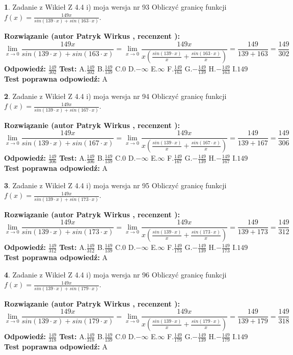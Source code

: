 \documentclass[12pt, a4paper]{article}
\theoremstyle{definition} %
\newtheorem{zad}{}
\newcommand{\zadStart}[1]{\begin{zad}#1\newline}
\newcommand{\zadStop}{\end{zad}}
\newcommand{\rozwStart}[2]{\noindent \textbf{Rozwiązanie (autor #1 , recenzent #2): }\newline}
\newcommand{\rozwStop}{\newline}
\newcommand{\odpStart}{\noindent \textbf{Odpowiedź:}\newline}
\newcommand{\odpStop}{\newline}
\newcommand{\testStart}{\noindent \textbf{Test:}\newline}
\newcommand{\testStop}{\newline}
\newcommand{\kluczStart}{\noindent \textbf{Test poprawna odpowiedź:}\newline}
\newcommand{\kluczStop}{\newline}
\begin{document}
\zadStart{Zadanie z Wikieł Z 4.4 i) moja wersja nr 93}
Obliczyć granicę funkcji $f(x)=\frac{149x}{sin(139\cdot x) +sin(163\cdot x)}$.
\zadStop
\rozwStart{Patryk Wirkus}{}
$$\lim\limits_{x\to 0}\frac{149x}{sin(139\cdot x) +sin(163\cdot x)}=\lim\limits_{x\to 0}\frac{149x}{x(\frac{sin(139\cdot x)}{x}+\frac{sin(163\cdot x)}{x})}=\frac{149}{139+163} = \frac{149}{302}$$
\rozwStop
\odpStart
$\frac{149}{302}$
\odpStop
\testStart
A.$\frac{149}{302}$
B.$\frac{149}{139}$
C.$0$
D.$-\infty$
E.$\infty$
F.$\frac{149}{163}$
G.$-\frac{149}{139}$
H.$-\frac{149}{163}$
I.$149$
\testStop
\kluczStart
A
\kluczStop



\zadStart{Zadanie z Wikieł Z 4.4 i) moja wersja nr 94}
Obliczyć granicę funkcji $f(x)=\frac{149x}{sin(139\cdot x) +sin(167\cdot x)}$.
\zadStop
\rozwStart{Patryk Wirkus}{}
$$\lim\limits_{x\to 0}\frac{149x}{sin(139\cdot x) +sin(167\cdot x)}=\lim\limits_{x\to 0}\frac{149x}{x(\frac{sin(139\cdot x)}{x}+\frac{sin(167\cdot x)}{x})}=\frac{149}{139+167} = \frac{149}{306}$$
\rozwStop
\odpStart
$\frac{149}{306}$
\odpStop
\testStart
A.$\frac{149}{306}$
B.$\frac{149}{139}$
C.$0$
D.$-\infty$
E.$\infty$
F.$\frac{149}{167}$
G.$-\frac{149}{139}$
H.$-\frac{149}{167}$
I.$149$
\testStop
\kluczStart
A
\kluczStop



\zadStart{Zadanie z Wikieł Z 4.4 i) moja wersja nr 95}
Obliczyć granicę funkcji $f(x)=\frac{149x}{sin(139\cdot x) +sin(173\cdot x)}$.
\zadStop
\rozwStart{Patryk Wirkus}{}
$$\lim\limits_{x\to 0}\frac{149x}{sin(139\cdot x) +sin(173\cdot x)}=\lim\limits_{x\to 0}\frac{149x}{x(\frac{sin(139\cdot x)}{x}+\frac{sin(173\cdot x)}{x})}=\frac{149}{139+173} = \frac{149}{312}$$
\rozwStop
\odpStart
$\frac{149}{312}$
\odpStop
\testStart
A.$\frac{149}{312}$
B.$\frac{149}{139}$
C.$0$
D.$-\infty$
E.$\infty$
F.$\frac{149}{173}$
G.$-\frac{149}{139}$
H.$-\frac{149}{173}$
I.$149$
\testStop
\kluczStart
A
\kluczStop



\zadStart{Zadanie z Wikieł Z 4.4 i) moja wersja nr 96}
Obliczyć granicę funkcji $f(x)=\frac{149x}{sin(139\cdot x) +sin(179\cdot x)}$.
\zadStop
\rozwStart{Patryk Wirkus}{}
$$\lim\limits_{x\to 0}\frac{149x}{sin(139\cdot x) +sin(179\cdot x)}=\lim\limits_{x\to 0}\frac{149x}{x(\frac{sin(139\cdot x)}{x}+\frac{sin(179\cdot x)}{x})}=\frac{149}{139+179} = \frac{149}{318}$$
\rozwStop
\odpStart
$\frac{149}{318}$
\odpStop
\testStart
A.$\frac{149}{318}$
B.$\frac{149}{139}$
C.$0$
D.$-\infty$
E.$\infty$
F.$\frac{149}{179}$
G.$-\frac{149}{139}$
H.$-\frac{149}{179}$
I.$149$
\testStop
\kluczStart
A
\kluczStop
\end{document}
